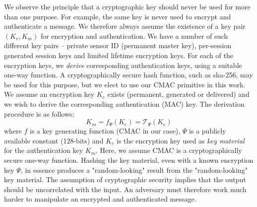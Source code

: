 We observe the principle that a cryptographic key should never be used for more than one purpose. For example, the same key is never used to encrypt and authenticate a message. We therefore always assume the existence of a key pair $(K_e,K_m)$ for encryption and authentication.
%
We have a number of such different key pairs -- private sensor ID (permanent master key), per-session generated session keys and limited lifetime encryption keys. For each of the encryption keys, we \textit{derive} corresponding authentication keys, using a suitable one-way function. A cryptographically secure hash function, such as sha-256, may be used for this purpose, but we elect to use our CMAC primitive in this work. We assume an encryption key $K_e$ exists (permanent, generated or delivered) and we wish to derive the corresponding authentication (MAC) key. The derivation procedure is as follows:
%
\[
K_m = f_\Psi(K_e) = \mathcal{T}_\Psi(K_e)
\]
%
where $f$ is a key generating function (CMAC in our case), $\Psi$ is a publicly available constant (128-bits) and $K_e$ is the encryption key used as \textit{key material} for the authentication key $K_m$. Here, we assume CMAC is a cryptographically secure one-way function. Hashing the key material, even with a known encryption key $\Psi$, in essence produces a "random-looking" result from the "random-looking" key material. The assumption of cryptographic security implies that the output should be uncorrelated with the input. An adversary must therefore work much harder to manipulate an encrypted and authenticated message.

